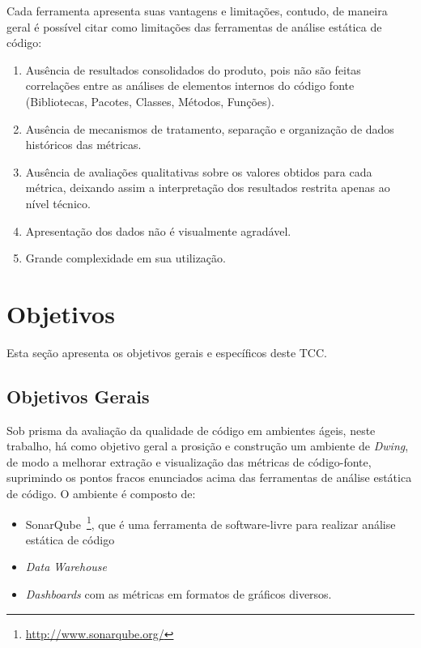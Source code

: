 Cada ferramenta apresenta suas vantagens e limitações, contudo, de maneira geral é possível citar como limitações das ferramentas de análise estática de código:

\begin{enumerate}
\item Ausência de resultados consolidados do produto, pois não são feitas correlações entre as análises de elementos internos do código fonte (Bibliotecas, Pacotes, Classes, Métodos, Funções).
\item Ausência de mecanismos de tratamento, separação e organização de dados históricos das métricas.
\item Ausência de avaliações qualitativas sobre os valores obtidos para cada métrica, deixando assim a interpretação dos resultados restrita apenas ao nível técnico.
\item Apresentação dos dados não é visualmente agradável.
\item Grande complexidade em sua utilização.
\end{enumerate}








\section{Objetivos}

Esta seção apresenta os objetivos gerais e específicos deste TCC.

\subsection{Objetivos Gerais}
Sob prisma da avaliação da qualidade de código em ambientes ágeis, neste trabalho, há como objetivo geral a prosição e construção um ambiente de \textit{Dwing}, de modo a melhorar extração e visualização das métricas de código-fonte, suprimindo os pontos fracos enunciados acima das ferramentas de análise estática de código. O ambiente é composto de:
 
\begin{itemize}
  \item SonarQube~\footnote{\url{http://www.sonarqube.org/}}, que é uma ferramenta de software-livre para realizar análise estática de código
  \item \textit{Data Warehouse}
  \item \textit{Dashboards} com as métricas em formatos de gráficos diversos.
\end{itemize}


